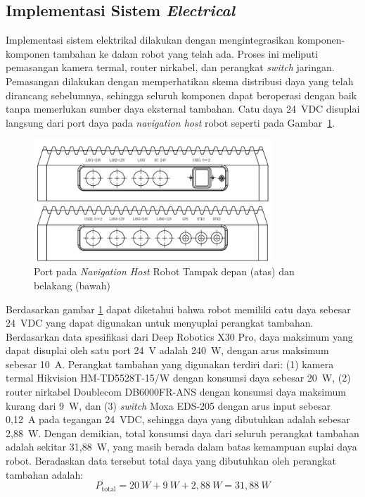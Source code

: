 \subsection{Implementasi Sistem \emph{Electrical}}
Implementasi sistem elektrikal dilakukan dengan mengintegrasikan komponen-komponen tambahan ke dalam robot yang telah ada. Proses ini meliputi pemasangan kamera termal, router nirkabel, dan perangkat \emph{switch} jaringan. Pemasangan dilakukan dengan memperhatikan skema distribusi daya yang telah dirancang sebelumnya, sehingga seluruh komponen dapat beroperasi dengan baik tanpa memerlukan sumber daya eksternal tambahan. Catu daya 24~VDC disuplai langsung dari port daya pada \emph{navigation host} robot seperti pada Gambar~\ref{fig:int-control-port}. 

\begin{figure}[H]
  \centering
  \includegraphics[width=0.8\textwidth]{gambar/bab3/int-control-port.png}
  \caption{Port pada \emph{Navigation Host} Robot  Tampak depan (atas) dan belakang (bawah) \cite{deeprobotics_jueyingx30}}
  \label{fig:int-control-port}
\end{figure}

Berdasarkan gambar \ref{fig:int-control-port} dapat diketahui bahwa robot memiliki catu daya sebesar 24~VDC yang dapat digunakan untuk menyuplai perangkat tambahan. Berdasarkan data spesifikasi dari Deep Robotics X30 Pro, daya maksimum yang dapat disuplai oleh satu port 24~V adalah 240~W, dengan arus maksimum sebesar 10~A. Perangkat tambahan yang digunakan terdiri dari: (1) kamera termal Hikvision HM-TD5528T-15/W dengan konsumsi daya sebesar 20~W, (2) router nirkabel Doublecom DB6000FR-ANS dengan konsumsi daya maksimum kurang dari 9~W, dan (3) \emph{switch} Moxa EDS-205 dengan arus input sebesar 0{,}12~A pada tegangan 24~VDC, sehingga daya yang dibutuhkan adalah sebesar 2{,}88~W. Dengan demikian, total konsumsi daya dari seluruh perangkat tambahan adalah sekitar 31{,}88~W, yang masih berada dalam batas kemampuan suplai daya robot. Beradaskan data tersebut total daya yang dibutuhkan oleh perangkat tambahan adalah:
\[
P_{\text{total}} = 20~W + 9~W + 2{,}88~W = 31{,}88~W
\]

